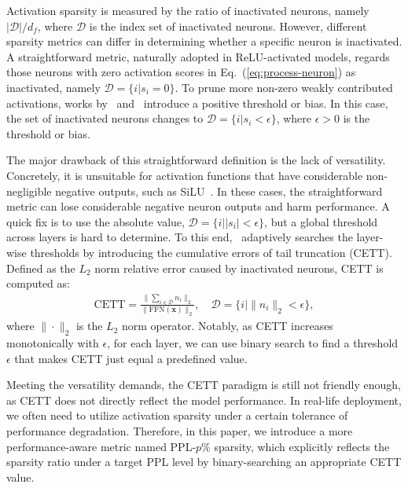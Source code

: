 \documentclass{article} %
\begin{document}
Activation sparsity is measured by the ratio of inactivated neurons, namely $|\mathcal{D}|/d_f$, where $\mathcal{D}$ is the index set of inactivated neurons. However, different sparsity metrics can differ in determining whether a specific neuron is inactivated. A straightforward metric, naturally adopted in ReLU-activated models, regards those neurons with zero activation scores in Eq.~(\ref{eq:process-neuron}) as inactivated, namely $\mathcal{D}=\{i|s_i=0\}$. To prune more non-zero weakly contributed activations, works by~\citet{kurtz2020inducing} and~\citet{mirzadeh2023relu} introduce a positive threshold or bias. In this case, the set of inactivated neurons changes to $\mathcal{D}=\{i|s_i<\epsilon\}$, where $\epsilon>0$ is the threshold or bias.

The major drawback of this straightforward definition is the lack of versatility. Concretely, it is unsuitable for activation functions that have considerable non-negligible negative outputs, such as SiLU~\citep{elfwing2018sigmoid}. In these cases, the straightforward metric can lose considerable negative neuron outputs and harm performance. A quick fix is to use the absolute value, $\mathcal{D}=\{i||s_i|<\epsilon\}$, but a global threshold across layers is hard to determine. To this end,~\citet{zhang2024relu} adaptively searches the layer-wise thresholds by introducing the cumulative errors of tail truncation (CETT). Defined as the $L_2$ norm relative error caused by inactivated neurons, CETT is computed as:
\begin{equation}
    \begin{aligned}
    \label{eq:cett-cal}
    \mathrm{CETT} = \frac{\|\sum_{i\in\mathcal{D}}n_i\|_2}{\|\mathrm{FFN}(\mathbf{x})\|_2}, \quad \mathcal{D} = \{i|\|n_i\|_2<\epsilon\},
    \end{aligned}
\end{equation}
where $\|\cdot\|_2$ is the $L_2$ norm operator. Notably, as CETT increases monotonically with $\epsilon$, for each layer, we can use binary search to find a threshold $\epsilon$ that makes CETT just equal a predefined value.

Meeting the versatility demands, the CETT paradigm is still not friendly enough, as CETT does not directly reflect the model performance. In real-life deployment, we often need to utilize activation sparsity under a certain tolerance of performance degradation. Therefore, in this paper, we introduce a more performance-aware metric named PPL-$p\%$ sparsity, which explicitly reflects the sparsity ratio under a target PPL level by binary-searching an appropriate CETT value.
\end{document}
